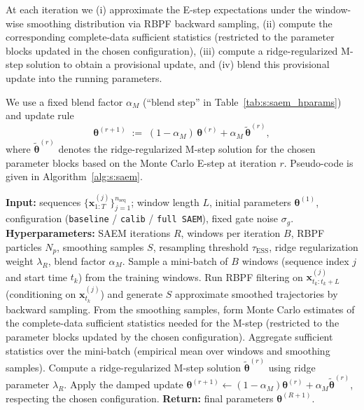 \documentclass[twoside]{article}
\theoremstyle{plain}
\theoremstyle{definition}
\theoremstyle{remark}
\begin{document}
At each iteration we (i) approximate the E-step expectations under the window-wise smoothing distribution via RBPF backward sampling, (ii) compute the corresponding complete-data sufficient statistics (restricted to the parameter blocks updated in the chosen configuration), (iii) compute a ridge-regularized M-step solution to obtain a provisional update, and (iv) blend this provisional update into the running parameters.

We use a fixed blend factor $\alpha_M$ (``blend step'' in Table~\ref{tab:s:saem_hparams}) and update rule
\begin{equation}
\bm\theta^{(r+1)}\;:=\;(1-\alpha_M)\,\bm\theta^{(r)}+\alpha_M\,\tilde{\bm\theta}^{(r)},
\end{equation}
where $\tilde{\bm\theta}^{(r)}$ denotes the ridge-regularized M-step solution for the chosen parameter blocks based on the Monte Carlo E-step at iteration $r$.
Pseudo-code is given in Algorithm~\ref{alg:s:saem}.

\begin{algorithm}[t]
\caption{Particle-SAEM update on windowed evidence}
\label{alg:s:saem}
\begin{algorithmic}[1]
\STATE \textbf{Input:} sequences $\{\bm x^{(j)}_{1:T}\}_{j=1}^{n_{\mathrm{seq}}}$; window length $L$, initial parameters $\bm\theta^{(1)}$, configuration (\texttt{baseline} / \texttt{calib} / \texttt{full SAEM}), fixed gate noise $\sigma_g$.
\STATE \textbf{Hyperparameters:} SAEM iterations $R$, windows per iteration $B$, RBPF particles $N_p$, smoothing samples $S$, resampling threshold $\tau_{\mathrm{ESS}}$, ridge regularization weight $\lambda_R$,
blend factor $\alpha_M$.
\STATE Sample a mini-batch of $B$ windows (sequence index $j$ and start time $t_k$) from the training windows.
\STATE Run RBPF filtering on $\bm x^{(j)}_{t_k:t_k+L}$ (conditioning on $\bm x^{(j)}_{t_k}$) and generate $S$ approximate smoothed trajectories by backward sampling.
\STATE From the smoothing samples, form Monte Carlo estimates of the complete-data sufficient statistics needed for the M-step (restricted to the parameter blocks updated by the chosen configuration).
\ENDFOR
\STATE Aggregate sufficient statistics over the mini-batch (empirical mean over windows and smoothing samples).
\STATE Compute a ridge-regularized M-step solution $\tilde{\bm\theta}^{(r)}$ using ridge parameter $\lambda_R$.
\STATE Apply the damped update $\bm\theta^{(r+1)}\leftarrow (1-\alpha_M)\bm\theta^{(r)}+\alpha_M\tilde{\bm\theta}^{(r)}$, respecting the chosen configuration.
\ENDFOR
\STATE \textbf{Return:} final parameters $\bm\theta^{(R+1)}$.
\end{algorithmic}
\end{algorithm}
\end{document}

